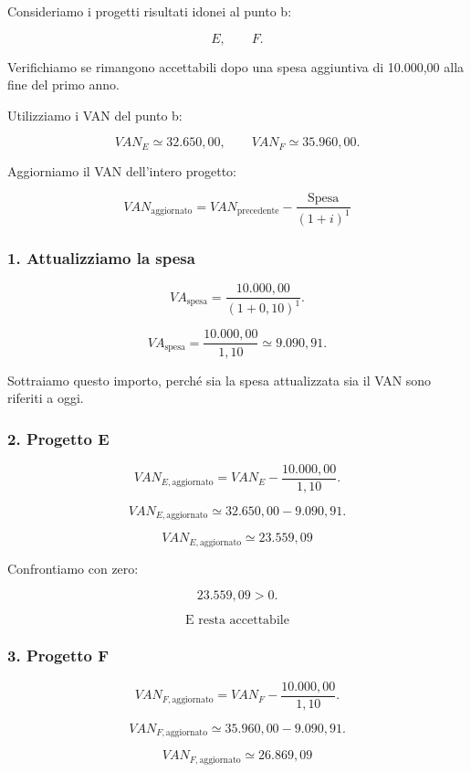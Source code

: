 \noindent Consideriamo i progetti
risultati idonei al punto b:

\[
E,\qquad F.
\]

\noindent Verifichiamo se rimangono accettabili
dopo una spesa aggiuntiva di 10.000,00
alla fine del primo anno.

\noindent Utilizziamo i VAN del punto b:

\[
VAN_E\simeq32.650{,}00,
\qquad
VAN_F\simeq35.960{,}00.
\]

\noindent Aggiorniamo il VAN
dell'intero progetto:

\[
\boxed{
VAN_{\text{aggiornato}}
=
VAN_{\text{precedente}}
-
\frac{\text{Spesa}}{(1+i)^1}
}
\]


\subsubsection*{1. Attualizziamo la spesa}

\[
VA_{\text{spesa}}
=
\frac{10.000{,}00}{(1+0{,}10)^1}.
\]

\[
VA_{\text{spesa}}
=
\frac{10.000{,}00}{1{,}10}
\simeq
\boxed{9.090{,}91}.
\]

\noindent Sottraiamo questo importo,
perché sia la spesa attualizzata
sia il VAN sono riferiti a oggi.


\subsubsection*{2. Progetto E}

\[
VAN_{E,\text{aggiornato}}
=
VAN_E-\frac{10.000{,}00}{1{,}10}.
\]

\[
VAN_{E,\text{aggiornato}}
\simeq
32.650{,}00-9.090{,}91.
\]

\[
\boxed{
VAN_{E,\text{aggiornato}}
\simeq23.559{,}09
}
\]

\noindent Confrontiamo con zero:

\[
23.559{,}09>0.
\]

\[
\boxed{
\text{E resta accettabile}
}
\]


\subsubsection*{3. Progetto F}

\[
VAN_{F,\text{aggiornato}}
=
VAN_F-\frac{10.000{,}00}{1{,}10}.
\]

\[
VAN_{F,\text{aggiornato}}
\simeq
35.960{,}00-9.090{,}91.
\]

\[
\boxed{
VAN_{F,\text{aggiornato}}
\simeq26.869{,}09
}
\]

